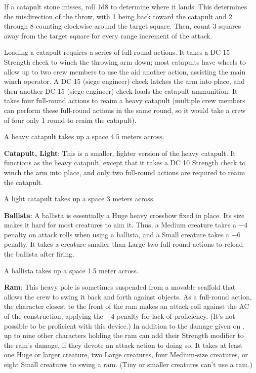 If a catapult stone misses, roll 1d8 to determine where it lands. This determines the misdirection of the throw, with 1 being back toward the catapult and 2 through 8 counting clockwise around the target square. Then, count 3 squares away from the target square for every range increment of the attack.

Loading a catapult requires a series of full-round actions. It takes a DC 15 Strength check to winch the throwing arm down; most catapults have wheels to allow up to two crew members to use the aid another action, assisting the main winch operator. A DC 15  (siege engineer) check latches the arm into place, and then another DC 15  (siege engineer) check loads the catapult ammunition. It takes four full-round actions to reaim a heavy catapult (multiple crew members can perform these full-round actions in the same round, so it would take a crew of four only 1 round to reaim the catapult).

A heavy catapult takes up a space 4.5 meters across.

\textbf{Catapult, Light}: This is a smaller, lighter version of the heavy catapult. It functions as the heavy catapult, except that it takes a DC 10 Strength check to winch the arm into place, and only two full-round actions are required to reaim the catapult.

A light catapult takes up a space 3 meters across.

\textbf{Ballista}: A ballista is essentially a Huge heavy crossbow fixed in place. Its size makes it hard for most creatures to aim it. Thus, a Medium creature takes a $-4$ penalty on attack rolls when using a ballista, and a Small creature takes a $-6$ penalty. It takes a creature smaller than Large two full-round actions to reload the ballista after firing.

A ballista takes up a space 1.5 meter across.

\textbf{Ram}: This heavy pole is sometimes suspended from a movable scaffold that allows the crew to swing it back and forth against objects. As a full-round action, the character closest to the front of the ram makes an attack roll against the AC of the construction, applying the $-4$ penalty for lack of proficiency. (It's not possible to be proficient with this device.) In addition to the damage given on , up to nine other characters holding the ram can add their Strength modifier to the ram's damage, if they devote an attack action to doing so. It takes at least one Huge or larger creature, two Large creatures, four Medium-size creatures, or eight Small creatures to swing a ram. (Tiny or smaller creatures can't use a ram.)

